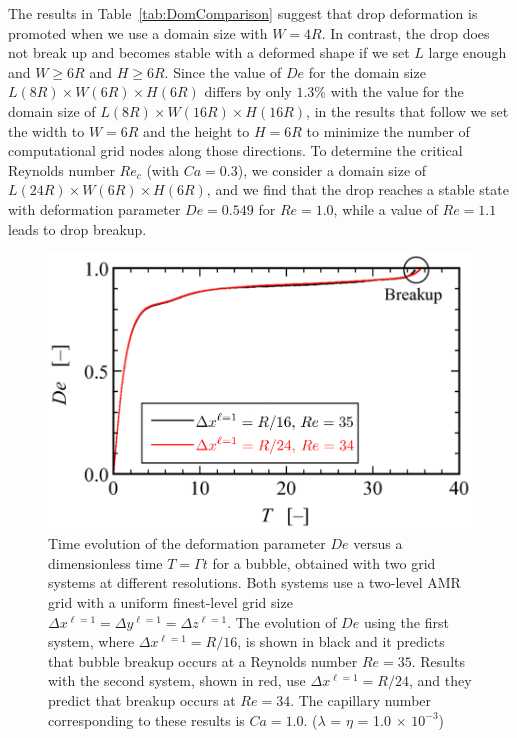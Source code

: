 \documentclass[%
 reprint,
 showkeys,
 amsmath,amssymb,
 aps,
 prfluids,
 onecolumn
]{revtex4-2}
\newcommand{\lwh}[3]{L(#1R)\times W(#2R) \times H(#3R)}
\begin{document}
The results in Table~\ref{tab:DomComparison} suggest that drop deformation is
promoted when we use a domain size with $W=4R$.  In contrast, the drop does not
break up and becomes stable with a deformed shape if we set $L$ large enough
and $W \geq 6R$ and $H \geq 6R$.  Since the value of $De$ for the domain size
$\lwh{8}{6}{6}$ differs by only $1.3\%$ with the value for the domain size of
$\lwh{8}{16}{16}$, in the results that follow we set the width to $W=6R$ and the
height to $H=6R$ to minimize the number of computational grid nodes along those
directions.  To determine the critical Reynolds number $Re_c$ (with $Ca=0.3$),
we consider a domain size of $\lwh{24}{6}{6}$, and we find that the drop
reaches a stable state with deformation parameter $De=0.549$ for $Re=1.0$,
while a value of $Re=1.1$ leads to drop breakup.
% 
\begin{figure}%
  \centering
  \includegraphics[width=\textwidth]{DeEvolution}
  \caption{Time evolution of the deformation parameter $De$ versus 
   a dimensionless
   time $T = \mathit{\Gamma} t$ for a bubble, obtained 
   with two grid systems at different resolutions. Both systems use a 
   two-level AMR grid with a uniform 
   finest-level grid size $\Delta x^{\ell=1} = \Delta y^{\ell=1} = 
   \Delta z ^{\ell=1}$. The evolution of $De$ using the first system, where
   $\Delta x^{\ell=1} = R/16$, is shown in black and it predicts that 
   bubble breakup occurs at a Reynolds number $Re=35$. 
   Results with the second system, shown in red, use $\Delta x^{\ell=1} 
   = R/24$, and they predict that breakup occurs at $Re=34$.  The capillary
   number corresponding to these results is $Ca=1.0$.
   ($\lambda$ = $\eta$ = 1.0 $\times$ $10^{-3}$)}
  \label{fig:DeEvolution}
\end{figure}
%
\end{document}
